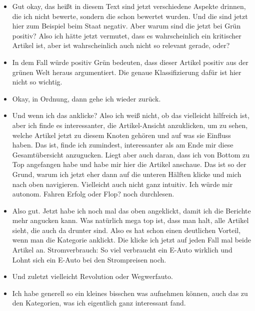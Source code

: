 {\begin{itemize}[]
              Von daher hätte ich das jetzt einfach angeklickt, weil es halt am interessantesten klingt.
        \item {} Gut okay, das heißt in diesem Text sind jetzt verschiedene Aspekte drinnen, die ich nicht bewerte, sondern die schon bewertet wurden.
              Und die sind jetzt hier zum Beispiel beim Staat negativ.
              Aber warum sind die jetzt bei Grün positiv?
              Also ich hätte jetzt vermutet, dass es wahrscheinlich ein kritischer Artikel ist, aber ist wahrscheinlich auch nicht so relevant gerade, oder?
        \item {} In dem Fall würde positiv Grün bedeuten, dass dieser Artikel positiv aus der grünen Welt heraus argumentiert.
              Die genaue Klassifizierung dafür ist hier nicht so wichtig.
        \item {} Okay, in Ordnung, dann gehe ich wieder zurück.
        \item {} Und wenn ich das anklicke?
              Also ich weiß nicht, ob das vielleicht hilfreich ist, aber ich finde es interessanter, die Artikel-Ansicht anzuklicken, um zu sehen, welche Artikel jetzt zu diesem Knoten gehören und auf was sie Einfluss haben.
              Das ist, finde ich zumindest, interessanter als am Ende mir diese Gesamtübersicht anzugucken.
              Liegt aber auch daran, dass ich von Bottom zu Top angefangen habe und habe mir hier die Artikel anschaue.
              Das ist so der Grund, warum ich jetzt eher dann auf die unteren Hälften klicke und mich nach oben navigieren.
              Vielleicht auch nicht ganz intuitiv.
              Ich würde mir \flqq autonom. Fahren Erfolg oder Flop?\frqq{} noch durchlesen.
        \item {} Also gut. Jetzt habe ich noch mal das oben angeklickt, damit ich die Berichte mehr angucken kann.
              Was natürlich mega top ist, dass man halt, alle Artikel sieht, die auch da drunter sind.
              Also es hat schon einen deutlichen Vorteil, wenn man die Kategorie anklickt.
              Die klicke ich jetzt auf jeden Fall mal beide Artikel an.
              \flqq Stromverbrauch: So viel verbraucht ein E-Auto wirklich\frqq{} und \flqq Lohnt sich ein E-Auto bei den Strompreisen noch\frqq{}.
        \item {} Und zuletzt vielleicht \flqq Revolution oder Wegwerfauto\frqq{}.
        \item {} Ich habe generell so ein kleines bisschen was aufnehmen können, auch das zu den Kategorien, was ich eigentlich ganz interessant fand.

\end{itemize}}
